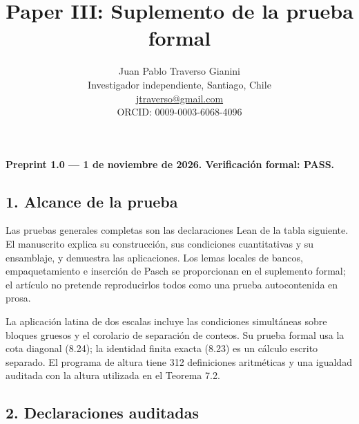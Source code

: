 \documentclass[spanish,11pt,a4paper]{article}
\title{Paper III: Suplemento de la prueba formal}
\author{Juan Pablo Traverso Gianini\\
\small Investigador independiente, Santiago, Chile\\
\small \href{mailto:jtraverso@gmail.com}{jtraverso@gmail.com}\\
\small ORCID: 0009-0003-6068-4096}
\date{}
\begin{document}
\raggedbottom\maketitle
\small\setlength{\parskip}{3pt}
\textbf{Preprint 1.0 --- 1 de noviembre de 2026. Verificación formal: PASS.}

\subsection{1. Alcance de la prueba}\label{alcance-de-la-prueba}

Las pruebas generales completas son las declaraciones Lean de la tabla siguiente. El manuscrito explica su construcción, sus condiciones cuantitativas y su ensamblaje, y demuestra las aplicaciones. Los lemas locales de bancos, empaquetamiento e inserción de Pasch se proporcionan en el suplemento formal; el artículo no pretende reproducirlos todos como una prueba autocontenida en prosa.

La aplicación latina de dos escalas incluye las condiciones simultáneas sobre bloques gruesos y el corolario de separación de conteos. Su prueba formal usa la cota diagonal (8.24); la identidad finita exacta (8.23) es un cálculo escrito separado. El programa de altura tiene 312 definiciones aritméticas y una igualdad auditada con la altura utilizada en el Teorema 7.2.

\subsection{2. Declaraciones auditadas}\label{declaraciones-auditadas}
\end{document}
